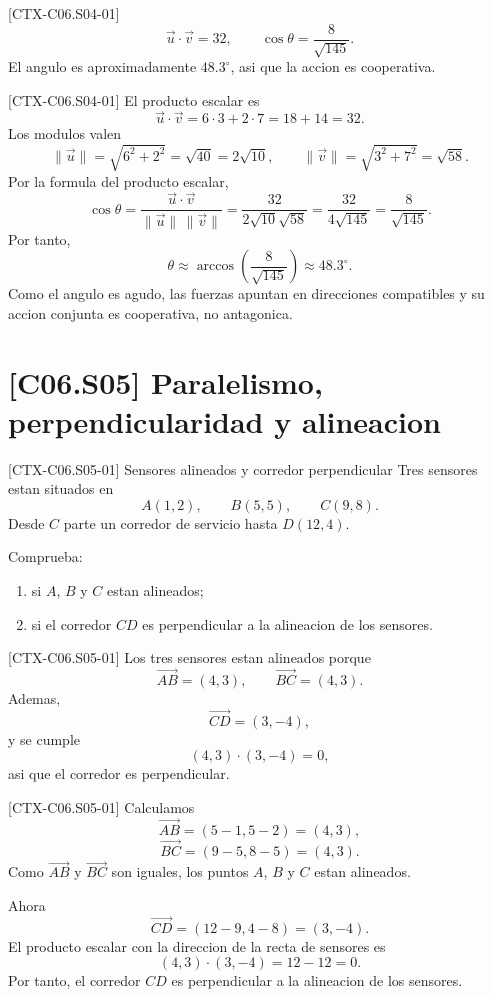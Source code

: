 \begin{shortanswer}{[CTX-C06.S04-01]}
\[
\vec u\cdot \vec v=32,
\qquad
\cos\theta=\frac{8}{\sqrt{145}}.
\]
El angulo es aproximadamente \(48.3^\circ\), asi que la accion es cooperativa.
\end{shortanswer}

\begin{fullsolution}{[CTX-C06.S04-01]}
El producto escalar es
\[
\vec u\cdot \vec v=6\cdot 3+2\cdot 7=18+14=32.
\]
Los modulos valen
\[
\|\vec u\|=\sqrt{6^2+2^2}=\sqrt{40}=2\sqrt{10},
\qquad
\|\vec v\|=\sqrt{3^2+7^2}=\sqrt{58}.
\]
Por la formula del producto escalar,
\[
\cos\theta=
\frac{\vec u\cdot \vec v}{\|\vec u\|\,\|\vec v\|}=
\frac{32}{2\sqrt{10}\sqrt{58}}=
\frac{32}{4\sqrt{145}}=
\frac{8}{\sqrt{145}}.
\]
Por tanto,
\[
\theta\approx \arccos\left(\frac{8}{\sqrt{145}}\right)\approx 48.3^\circ.
\]
Como el angulo es agudo, las fuerzas apuntan en direcciones compatibles y su accion conjunta
es cooperativa, no antagonica.
\end{fullsolution}

\section{[C06.S05] Paralelismo, perpendicularidad y alineacion}

\begin{exercise}{[CTX-C06.S05-01] Sensores alineados y corredor perpendicular}
Tres sensores estan situados en
\[
A(1,2),\qquad B(5,5),\qquad C(9,8).
\]
Desde \(C\) parte un corredor de servicio hasta \(D(12,4)\).

Comprueba:
\begin{enumerate}
  \item si \(A\), \(B\) y \(C\) estan alineados;
  \item si el corredor \(CD\) es perpendicular a la alineacion de los sensores.
\end{enumerate}
\end{exercise}

\begin{shortanswer}{[CTX-C06.S05-01]}
Los tres sensores estan alineados porque
\[
\overrightarrow{AB}=(4,3),\qquad \overrightarrow{BC}=(4,3).
\]
Ademas,
\[
\overrightarrow{CD}=(3,-4),
\]
y se cumple
\[
(4,3)\cdot(3,-4)=0,
\]
asi que el corredor es perpendicular.
\end{shortanswer}

\begin{fullsolution}{[CTX-C06.S05-01]}
Calculamos
\[
\overrightarrow{AB}=(5-1,5-2)=(4,3),
\]
\[
\overrightarrow{BC}=(9-5,8-5)=(4,3).
\]
Como \(\overrightarrow{AB}\) y \(\overrightarrow{BC}\) son iguales, los puntos \(A\), \(B\) y
\(C\) estan alineados.

Ahora
\[
\overrightarrow{CD}=(12-9,4-8)=(3,-4).
\]
El producto escalar con la direccion de la recta de sensores es
\[
(4,3)\cdot(3,-4)=12-12=0.
\]
Por tanto, el corredor \(CD\) es perpendicular a la alineacion de los sensores.
\end{fullsolution}

